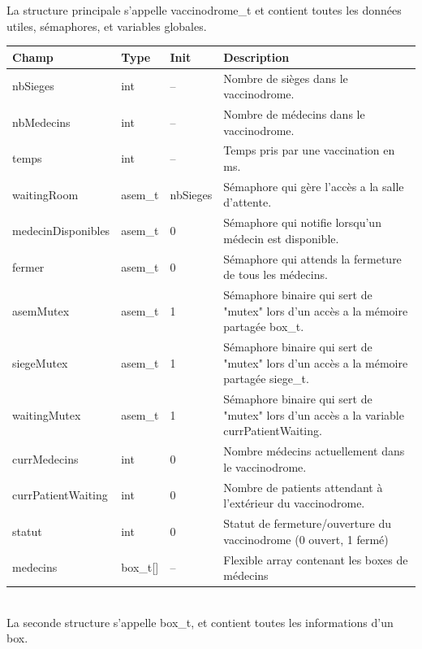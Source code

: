\documentclass[a4paper]{article}
\begin{document}
  La structure principale s'appelle vaccinodrome\_t et contient toutes les données utiles, sémaphores, et variables globales.

  \begin{tabularx}{\linewidth}{|l|l|l|X|}
    \hline
    Champ & Type & Init & Description \\ \hline%
    nbSieges & int & -- & Nombre de sièges dans le vaccinodrome. \\ \hline%
    nbMedecins & int & -- & Nombre de médecins dans le vaccinodrome. \\ \hline%
    temps & int & -- & Temps pris par une vaccination en ms. \\ \hline%

    waitingRoom & asem\_t & nbSieges & Sémaphore qui gère l'accès a la salle d'attente. \\ \hline%
    medecinDisponibles & asem\_t & 0 & Sémaphore qui notifie lorsqu'un médecin est disponible. \\ \hline%
    fermer & asem\_t & 0 & Sémaphore qui attends la fermeture de tous les médecins. \\ \hline%

    asemMutex & asem\_t & 1 & Sémaphore binaire qui sert de "mutex" lors d'un accès a la mémoire partagée box\_t. \\ \hline%
    siegeMutex & asem\_t & 1 & Sémaphore binaire qui sert de "mutex" lors d'un accès a la mémoire partagée siege\_t. \\ \hline%
    waitingMutex & asem\_t & 1 & Sémaphore binaire qui sert de "mutex" lors d'un accès a la variable currPatientWaiting. \\ \hline%

    currMedecins & int & 0 & Nombre médecins actuellement dans le vaccinodrome. \\ \hline%
    currPatientWaiting & int & 0 & Nombre de patients attendant à l'extérieur du vaccinodrome. \\ \hline%
    statut & int & 0 & Statut de fermeture/ouverture du vaccinodrome (0 ouvert, 1 fermé) \\ \hline%
    medecins & box\_t[] & -- & Flexible array contenant les boxes de médecins \\ \hline%

  \end{tabularx}
  \\[12pt]
  La seconde structure s'appelle box\_t, et contient toutes les informations d'un box.
\end{document}
